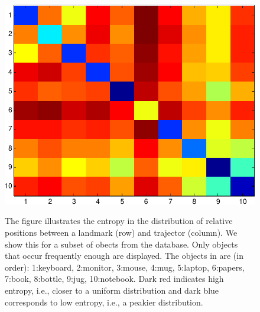\documentclass[letterpaper, 10 pt, conference]{ieeeconf}  %
\begin{document}
\begin{figure}
\begin{center}
\includegraphics[width=\linewidth]{entropy_matrix-crop}
\label{fig:entropy}
\caption{The figure illustrates the entropy in the distribution of relative positions between a landmark (row) and trajector (column). We show this for a subset of obects from the database. Only objects that occur frequently enough are displayed. The objects in are (in order): 1:keyboard, 2:monitor, 3:mouse, 4:mug, 5:laptop, 6:papers, 7:book, 8:bottle, 9:jug, 10:notebook. Dark red indicates high entropy, i.e., closer to a uniform distribution and dark blue corresponds to low entropy, i.e., a peakier distribution.}
\end{center}
\end{figure}
\end{document}
